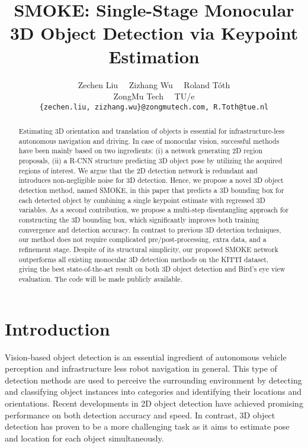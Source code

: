 \documentclass[10pt,twocolumn,letterpaper]{article}
\begin{document}
\title{SMOKE: Single-Stage Monocular 3D Object Detection via Keypoint Estimation}
\author{Zechen Liu ~~\quad Zizhang Wu  ~~\quad Roland T\'oth\\
ZongMu Tech ~~\quad TU/e\\
{\tt\small {\{zechen.liu, zizhang.wu\}}@zongmutech.com, R.Toth@tue.nl}
}

\maketitle


\begin{abstract}
    Estimating 3D orientation and translation of objects is essential for infrastructure-less autonomous navigation and driving. In case of monocular vision, successful methods have been mainly based on two ingredients: (i) a network generating 2D region proposals, (ii) a R-CNN structure predicting 3D object pose by utilizing the acquired regions of interest. We argue that the 2D detection network is redundant and introduces non-negligible noise for 3D detection. Hence, we propose a novel 3D object detection method, named SMOKE, in this paper that predicts a 3D bounding box for each detected object by combining a single keypoint estimate with regressed 3D variables. As a second contribution, we propose a multi-step disentangling approach for constructing the 3D bounding box, which significantly improves both training convergence and detection accuracy. In contrast to previous 3D detection techniques, our method does not require complicated pre/post-processing, extra data, and a refinement stage. Despite of its structural simplicity, our proposed SMOKE network outperforms all existing monocular 3D detection methods on the KITTI dataset, giving the best state-of-the-art result on both 3D object detection and Bird's eye view evaluation. The code will be made publicly available.
\end{abstract}

\section{Introduction}

    Vision-based object detection is an essential ingredient of autonomous vehicle perception and infrastructure less robot navigation in general. This type of detection methods are used to perceive the surrounding environment by detecting and classifying object instances into categories and identifying their locations and orientations. Recent developments in 2D object detection \cite{faster_rcnn_2015, ssd_2015, yolo_2016, retinanet_2017, cornernet_2018, centernet_2019} have achieved promising performance on both detection accuracy and speed. In contrast, 3D object detection \cite{mono3d_2016, stereorcnn_2019, voxelnet_2018} has proven to be a more challenging task as it aims to estimate pose and location for each object simultaneously.
    
\end{document}
